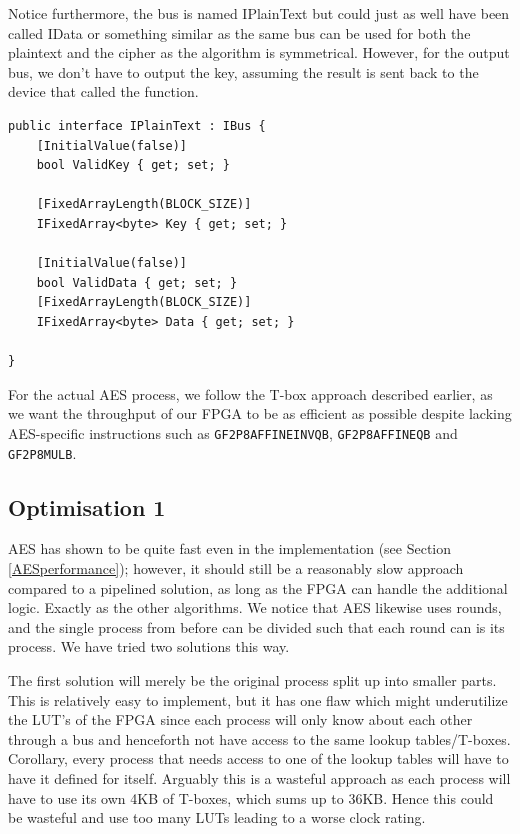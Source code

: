 \documentclass[a4paper, openany]{book}
\begin{document}
Notice furthermore, the bus is named IPlainText but could just as well have been called IData or something similar as the same bus can be used for both the plaintext and the cipher as the algorithm is symmetrical. However, for the output bus, we don't have to output the key, assuming the result is sent back to the device that called the function.

\begin{verbatim}
public interface IPlainText : IBus {
    [InitialValue(false)]
    bool ValidKey { get; set; }

    [FixedArrayLength(BLOCK_SIZE)]
    IFixedArray<byte> Key { get; set; }

    [InitialValue(false)]
    bool ValidData { get; set; }
    [FixedArrayLength(BLOCK_SIZE)]
    IFixedArray<byte> Data { get; set; }

}
\end{verbatim}
For the actual AES process, we follow the T-box approach described earlier, as we want the throughput of our FPGA to be as efficient as possible despite lacking AES-specific instructions such as \texttt{GF2P8AFFINEINVQB}, \texttt{GF2P8AFFINEQB} and \texttt{GF2P8MULB}.
\subsection{Optimisation 1}
\label{AESopt}
AES has shown to be quite fast even in the implementation (see Section \ref{AESperformance}); however, it should still be a reasonably slow approach compared to a pipelined solution, as long as the FPGA can handle the additional logic. Exactly as the other algorithms. We notice that AES likewise uses rounds, and the single process from before can be divided such that each round can is its process. We have tried two solutions this way.

The first solution will merely be the original process split up into smaller parts. This is relatively easy to implement, but it has one flaw which might underutilize the LUT's of the FPGA since each process will only know about each other through a bus and henceforth not have access to the same lookup tables/T-boxes. Corollary, every process that needs access to one of the lookup tables will have to have it defined for itself. Arguably this is a wasteful approach as each process will have to use its own 4KB of T-boxes, which sums up to 36KB. Hence this could be wasteful and use too many LUTs leading to a worse clock rating.
\end{document}

